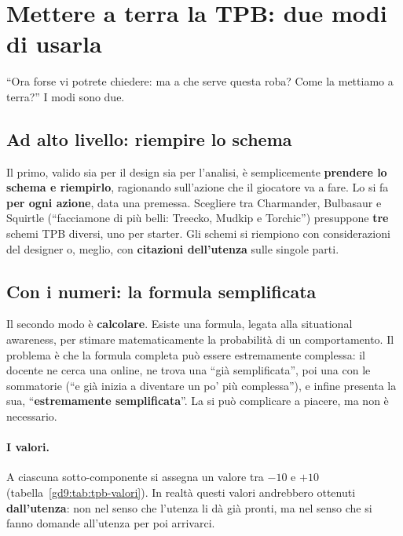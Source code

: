 \section{Mettere a terra la TPB: due modi di usarla}
\label{gd9:sec:formula}

``Ora forse vi potrete chiedere: ma a che serve questa roba? Come la
mettiamo a terra?'' I modi sono due.

\subsection{Ad alto livello: riempire lo schema}

Il primo, valido sia per il design sia per l'analisi, è semplicemente
\textbf{prendere lo schema e riempirlo}, ragionando sull'azione che il
giocatore va a fare. Lo si fa \textbf{per ogni azione}, data una premessa.
Scegliere tra Charmander, Bulbasaur e Squirtle (``facciamone di più belli:
Treecko, Mudkip e Torchic'') presuppone \textbf{tre} schemi TPB diversi, uno
per starter. Gli schemi si riempiono con considerazioni del designer o, meglio,
con \textbf{citazioni dell'utenza} sulle singole parti.

\subsection{Con i numeri: la formula semplificata}

Il secondo modo è \textbf{calcolare}. Esiste una formula, legata alla
situational awareness, per stimare matematicamente la probabilità di un
comportamento. Il problema è che la formula completa può essere estremamente
complessa: il docente ne cerca una online, ne trova una ``già semplificata'',
poi una con le sommatorie (``e già inizia a diventare un po' più
complessa''), e infine presenta la sua, ``\textbf{estremamente
semplificata}''. La si può complicare a piacere, ma non è necessario.

\paragraph{I valori.} A ciascuna sotto-componente si assegna un valore tra
$-10$ e $+10$ (tabella~\ref{gd9:tab:tpb-valori}). In realtà questi valori
andrebbero ottenuti \textbf{dall'utenza}: non nel senso che l'utenza li dà
già pronti, ma nel senso che si fanno domande all'utenza per poi arrivarci.

